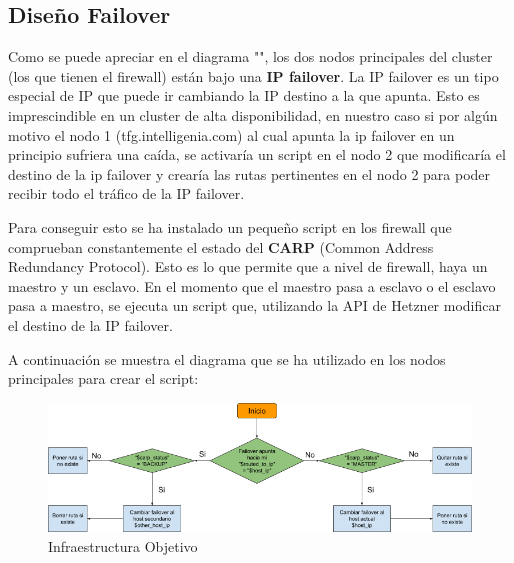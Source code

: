 \subsection{Diseño Failover}
\begin{text}
	Como se puede apreciar en el diagrama "", los dos nodos principales del cluster (los que tienen el firewall) están bajo una \textbf{IP failover}. La IP failover es un tipo especial de IP que puede ir cambiando la IP destino a la que apunta. Esto es imprescindible en un cluster de alta disponibilidad, en nuestro caso si por algún motivo el nodo 1 (tfg.intelligenia.com) al cual apunta la ip failover en un principio sufriera una caída, se activaría un script en el nodo 2 que modificaría el destino de la ip failover y crearía las rutas pertinentes en el nodo 2 para poder recibir todo el tráfico de la IP failover.
	
	Para conseguir esto se ha instalado un pequeño script en los firewall que comprueban constantemente el estado del \textbf{CARP} (Common Address Redundancy Protocol). Esto es lo que permite que a nivel de firewall, haya un maestro y un esclavo. En el momento que el maestro pasa a esclavo o el esclavo pasa a maestro, se ejecuta un script que, utilizando la API de Hetzner modificar el destino de la IP failover.
	
	A continuación se muestra el diagrama que se ha utilizado en los nodos principales para crear el script:
	
	\begin{figure}[!hbt]
		\label{script_failover}
		\centering
		\includegraphics[scale=0.45]{imagenes/Diseno/diagramascript.png}
		\caption[Infraestructura Objetivo]{Infraestructura Objetivo}
	\end{figure}
\end{text}
\clearpage

